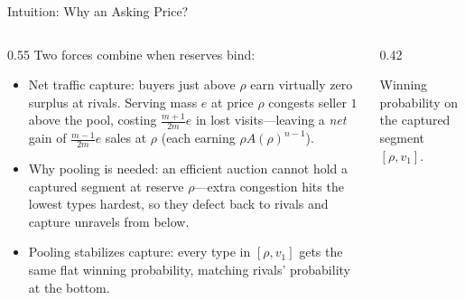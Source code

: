 \documentclass[11pt,aspectratio=169]{beamer}
\def\meditem{\smallskip\item}
\begin{document}
\begin{frame}{Intuition: Why an Asking Price?}
\begin{columns}[T]
\begin{column}{0.55\textwidth}
Two forces combine when reserves bind:
\begin{itemize}
\item \alert{Net traffic capture}: buyers just above $\rho$ earn virtually zero surplus at rivals. Serving mass $e$ at price $\rho$ congests seller $1$ above the pool, costing $\frac{m+1}{2m}e$ in lost visits---leaving a \emph{net} gain of $\frac{m-1}{2m}e$ sales at $\rho$ (each earning $\rho A(\rho)^{n-1}$).
\meditem \alert{Why pooling is needed}: an efficient auction cannot hold a captured segment at reserve $\rho$---extra congestion hits the lowest types hardest, so they defect back to rivals and capture unravels from below.
\meditem<2-> \alert{Pooling stabilizes capture}: every type in $[\rho,v_1]$ gets the same flat winning probability, matching rivals' probability at the bottom.
\end{itemize}
\end{column}
\begin{column}{0.42\textwidth}
\centering{}

{\scriptsize Winning probability on the captured segment $[\rho,v_1]$.}
\end{column}
\end{columns}
\end{frame}
\end{document}
